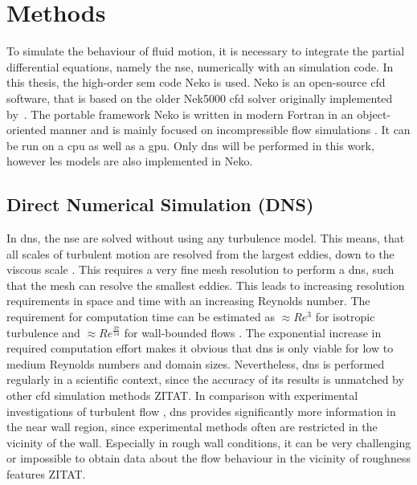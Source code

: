 \chapter{Methods}\label{chap: Methods}

To simulate the behaviour of fluid motion, it is necessary to integrate the partial differential equations, namely the \acrlong{nse}, numerically with an  simulation code.
In this thesis, the high-order \acrfull{sem} code Neko is used.
Neko is an open-source \acrfull{cfd} software, that is based on the older Nek5000 \acrshort{cfd} solver originally implemented by~\cite{fischerNek500WebPage}.
The portable framework Neko is written in modern Fortran in an object-oriented manner and is mainly focused on incompressible flow simulations \citep{janssonNekoModernPortable2024}.
It can be run on a \acrfull{cpu} as well as a \acrfull{gpu}.
Only \acrfull{dns} will be performed in this work, however \acrfull{les} models are also implemented in Neko.

\section{Direct Numerical Simulation (DNS)}
In \acrshort{dns}, the \acrlong{nse} are solved without using any turbulence model.
This means, that all scales of turbulent motion are resolved from the largest eddies, down to the viscous scale .
This requires a very fine mesh resolution to perform a \acrshort{dns}, such that the mesh can resolve the smallest eddies.
This leads to increasing resolution requirements in space and time with an increasing Reynolds number.
The requirement for computation time can be estimated as  $\approx Re^3$ for isotropic turbulence and $\approx Re^\frac{37}{14}$ for wall-bounded flows \citep{choiGridpointRequirementsLarge2012}.
The exponential increase in required computation effort makes it obvious that \acrshort{dns} is only viable for low to medium Reynolds numbers and domain sizes.
Nevertheless, \acrshort{dns} is performed regularly in a scientific context, since the accuracy of its results is unmatched by other \acrshort{cfd} simulation methods ZITAT.
In comparison with experimental investigations of turbulent flow , \acrshort{dns} provides significantly more information in the near wall region, since experimental methods often are restricted in the vicinity of the wall.
Especially in rough wall conditions, it can be very challenging or impossible to obtain data about the flow behaviour in the vicinity of roughness features ZITAT.

